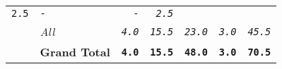 \documentclass[11pt,A4paper,]{article}
\begin{document}
\begin{longtable}[]{@{}llrrrrr@{}}
\begin{minipage}[t]{0.14\columnwidth}
\texttt{2.5}\strut
\end{minipage} & \begin{minipage}[t]{0.14\columnwidth}\raggedleft\strut
\texttt{-}\strut
\end{minipage} & \begin{minipage}[t]{0.14\columnwidth}\raggedleft\strut
\texttt{-}\strut
\end{minipage} & \begin{minipage}[t]{0.14\columnwidth}\raggedleft\strut
\emph{\texttt{2.5}}\strut
\end{minipage}\tabularnewline
\begin{minipage}[t]{0.14\columnwidth}\raggedright\strut
\strut
\end{minipage} & \begin{minipage}[t]{0.14\columnwidth}\raggedright\strut
\emph{All}\strut
\end{minipage} & \begin{minipage}[t]{0.14\columnwidth}\raggedleft\strut
\emph{\texttt{4.0}}\strut
\end{minipage} & \begin{minipage}[t]{0.14\columnwidth}\raggedleft\strut
\emph{\texttt{15.5}}\strut
\end{minipage} & \begin{minipage}[t]{0.14\columnwidth}\raggedleft\strut
\emph{\texttt{23.0}}\strut
\end{minipage} & \begin{minipage}[t]{0.14\columnwidth}\raggedleft\strut
\emph{\texttt{3.0}}\strut
\end{minipage} & \begin{minipage}[t]{0.14\columnwidth}\raggedleft\strut
\emph{\texttt{45.5}}\strut
\end{minipage}\tabularnewline
\begin{minipage}[t]{0.14\columnwidth}\raggedright\strut
\strut
\end{minipage} & \begin{minipage}[t]{0.14\columnwidth}\raggedright\strut
\textbf{Grand Total}\strut
\end{minipage} & \begin{minipage}[t]{0.14\columnwidth}\raggedleft\strut
\textbf{\texttt{4.0}}\strut
\end{minipage} & \begin{minipage}[t]{0.14\columnwidth}\raggedleft\strut
\textbf{\texttt{15.5}}\strut
\end{minipage} & \begin{minipage}[t]{0.14\columnwidth}\raggedleft\strut
\textbf{\texttt{48.0}}\strut
\end{minipage} & \begin{minipage}[t]{0.14\columnwidth}\raggedleft\strut
\textbf{\texttt{3.0}}\strut
\end{minipage} & \begin{minipage}[t]{0.14\columnwidth}\raggedleft\strut
\textbf{\texttt{70.5}}\strut
\end{minipage}\tabularnewline
\bottomrule
\end{longtable}
\end{document}

